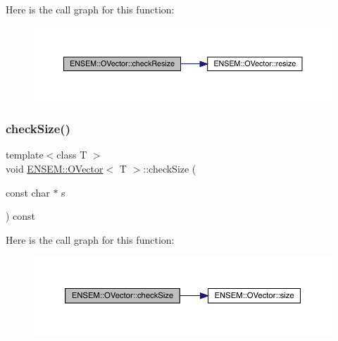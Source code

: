 Here is the call graph for this function\+:
\nopagebreak
\begin{figure}[H]
\begin{center}
\leavevmode
\includegraphics[width=350pt]{d0/d8d/classENSEM_1_1OVector_ac909025f6c5d78479f5dcbef8151d571_cgraph}
\end{center}
\end{figure}
\mbox{\label{classENSEM_1_1OVector_a12d09a71bb2808a7404578da9ba41c4f}} 
\subsubsection{\texorpdfstring{checkSize()}{checkSize()}\hspace{0.1cm}{\footnotesize\ttfamily [1/6]}}
{\footnotesize\ttfamily template$<$class T $>$ \\
void \mbox{\hyperlink{classENSEM_1_1OVector}{E\+N\+S\+E\+M\+::\+O\+Vector}}$<$ T $>$\+::check\+Size (\begin{DoxyParamCaption}\item[{const char $\ast$}]{s }\end{DoxyParamCaption}) const\hspace{0.3cm}{\ttfamily [inline]}}

Here is the call graph for this function\+:
\nopagebreak
\begin{figure}[H]
\begin{center}
\leavevmode
\includegraphics[width=350pt]{d0/d8d/classENSEM_1_1OVector_a12d09a71bb2808a7404578da9ba41c4f_cgraph}
\end{center}
\end{figure}
\mbox{\label{classENSEM_1_1OVector_a12d09a71bb2808a7404578da9ba41c4f}} 
